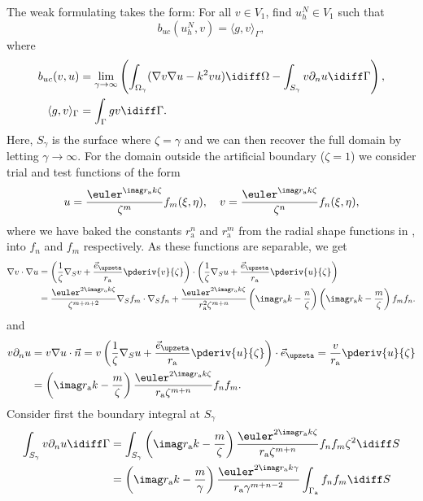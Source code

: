 The weak formulating takes the form: For all $v\in V_1$, find $u_h^N\in V_1$ such that
\begin{equation*}
	b_{uc}(u_h^N, v) = \langle g,v\rangle_\Gamma,
\end{equation*}
where
\begin{align}\label{Eq2:infElemntBilinearForm3}
	b_{uc}(v,u) &= \lim_{\gamma\to\infty}\left(\int_{\Omega_\gamma} (\nabla v \nabla u - k^2 vu)\idiff\Omega - \int_{S_\gamma} v\partial_n u\idiff\Gamma\right),\\
	\langle g,v\rangle_\Gamma &= \int_\Gamma gv\idiff\Gamma.\nonumber
\end{align}
Here, $S_\gamma$ is the surface where $\zeta = \gamma$ and we can then recover the full domain by letting $\gamma\to\infty$. For the domain outside the artificial boundary ($\zeta = 1$) we consider trial and test functions of the form
\begin{equation*}
	u = \frac{\euler^{\imag r_{\mathrm{a}}k\zeta}}{\zeta^m}f_m(\xi,\eta),\quad v = \frac{\euler^{\imag r_{\mathrm{a}} k\zeta}}{\zeta^n}f_n(\xi,\eta),
\end{equation*}
where we have baked the constants $r_{\mathrm{a}}^n$ and $r_{\mathrm{a}}^m$ from the radial shape functions in , into $f_n$ and $f_m$ respectively. As these functions are separable, we get
\begin{align*}
	\nabla v\cdot\nabla u &= \left(\frac{1}{\zeta}\nabla_S v + \frac{\vec{e}_{\upzeta}}{r_{\mathrm{a}}}\pderiv{v}{\zeta}\right)\cdot\left(\frac{1}{\zeta}\nabla_S u + \frac{\vec{e}_{\upzeta}}{r_{\mathrm{a}}}\pderiv{u}{\zeta}\right)\\
	&= \frac{\euler^{2\imag r_{\mathrm{a}} k\zeta}}{\zeta^{m+n+2}}\nabla_S f_m\cdot\nabla_S f_n + \frac{\euler^{2\imag r_{\mathrm{a}} k\zeta}}{r_{\mathrm{a}}^2\zeta^{m+n}}\left(\imag r_{\mathrm{a}} k - \frac{n}{\zeta}\right)\left(\imag r_{\mathrm{a}} k - \frac{m}{\zeta}\right)f_m f_n.
\end{align*}
and
\begin{align*}
	v\partial_n u &= v\nabla u\cdot\vec{n} = v\left(\frac{1}{\zeta}\nabla_S u + \frac{\vec{e}_{\upzeta}}{r_{\mathrm{a}}}\pderiv{u}{\zeta}\right)\cdot\vec{e}_{\upzeta} = \frac{v}{r_{\mathrm{a}}}\pderiv{u}{\zeta}\\
	&= \left(\imag r_{\mathrm{a}} k - \frac{m}{\zeta}\right) \frac{\euler^{2\imag r_{\mathrm{a}} k\zeta}}{r_{\mathrm{a}}\zeta^{m+n}}f_n f_m.
\end{align*}
Consider first the boundary integral at $S_\gamma$
\begin{align*}
	\int_{S_\gamma} v\partial_n u\idiff\Gamma &= \int_{S_\gamma}\left(\imag r_{\mathrm{a}} k - \frac{m}{\zeta}\right) \frac{\euler^{2\imag r_{\mathrm{a}} k\zeta}}{r_{\mathrm{a}}\zeta^{m+n}}f_n f_m\zeta^2\idiff S\\
	&= \left(\imag r_{\mathrm{a}} k - \frac{m}{\gamma}\right) \frac{\euler^{2\imag r_{\mathrm{a}} k\gamma}}{r_{\mathrm{a}} \gamma^{m+n-2}}\int_{\Gamma_{\mathrm{a}}}f_n f_m\idiff S
\end{align*}
